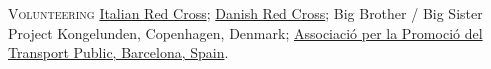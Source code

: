 \begin{paracol}{2}
  \textsc{Volunteering}
\switchcolumn
  \href{https://www.cri.it}{Italian Red Cross};
  \href{https://www.rodekors.dk/}{Danish Red Cross};
  Big Brother / Big Sister Project Kongelunden, Copenhagen, Denmark;
  \href{https://transportpublic.org/}{Associació per la Promoció del Transport Public, Barcelona, Spain}.
\end{paracol}